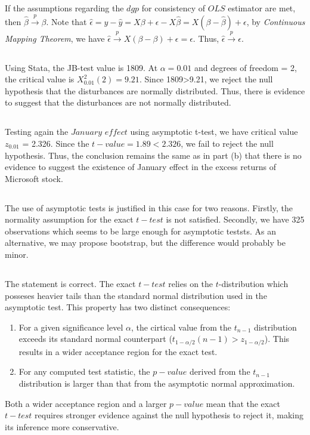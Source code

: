 \subsection{}
If the assumptions regarding the $dgp$  for consistency of $OLS$ estimator are met, then $\hat{\beta} \overset{p}{\rightarrow} \beta$. Note that $\hat{\epsilon} = y - \hat{y} =  X\beta + \epsilon - X\hat{\beta} = X(\beta - \hat{\beta}) + \epsilon$, by \textit{Continuous Mapping Theorem}, we have  $\hat{\epsilon} \overset{p}{\rightarrow} X(\beta - \beta) + \epsilon = \epsilon$. Thus, $\hat{\epsilon} \overset{p}{\rightarrow} \epsilon$.

\subsection{}

Using Stata, the JB-test value is 1809. At $\alpha=0.01$ and degrees of freedom  = 2, the critical value is $X^2_{0.01}(2) = 9.21$. Since 1809>9.21, we reject the null hypothesis that the disturbances are normally distributed. Thus, there is evidence to suggest that the disturbances are not normally distributed.

\subsection{}
Testing again the $January$ $effect$ using asymptotic t-test, we have critical value  $z_{0.01}$ = 2.326. Since the $t-value = 1.89 < 2.326$, we fail to reject the null hypothesis. Thus, the conclusion remains the same as in part (b) that there is no evidence to suggest the existence of January effect in the excess returns of Microsoft stock. 

\subsection{}
The use of asymptotic tests is justified in this case for two reasons. Firstly, the normality assumption for the exact $t-test$ is not satisfied. Secondly, we have 325 observations which seems to be large enough for asymptotic teststs. As an alternative, we may propose bootstrap, but the difference would probably be minor. 

\subsection{}
The statement is correct. The exact $t-test$ relies on the $t$-distribution which posseses heavier tails than the standard normal distribution used in the asymptotic test. This property has two distinct consequences:
\begin{enumerate}
\item For a given significance level $\alpha$, the cirtical value from the $t_{n-1}$ distribution exceeds its standard normal counterpart ($t_{1-\alpha/2}(n-1) > z_{1-\alpha/2}$). This results in a wider acceptance region for the exact test.
\item For any computed test statistic, the $p-value$ derived from the $t_{n-1}$ distribution is larger than that from the asymptotic normal approximation. 
\end{enumerate}

\noindent Both a wider acceptance region and a larger $p-value$ mean that the exact $t-test$ requires stronger evidence against the null hypothesis to reject it, making its inference more conservative. 